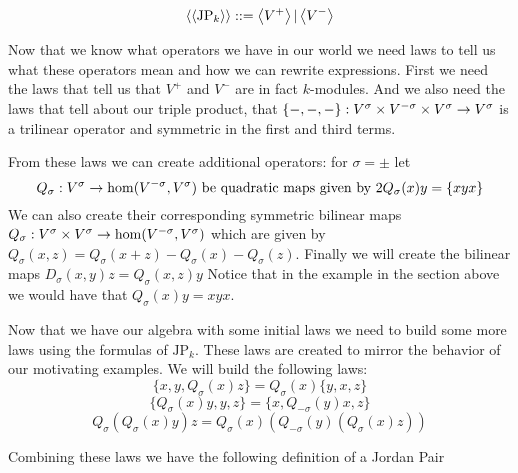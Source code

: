 \[\left\langle \left\langle \text{JP}_k \right\rangle \right\rangle::= \left\langle V^+ \right\rangle | \left\langle V^- \right\rangle\]

Now that we know what operators we have in our world we need laws to tell us what these operators mean and how we can rewrite expressions.
First we need the laws that tell us that $V^+$ and $V^-$ are in fact $k$-modules.
And we also need the laws that tell about our triple product, that $\{-,-,-\}:V^\sigma\times V^{-\sigma}\times V^\sigma\rightarrow V^\sigma$ is a trilinear operator and symmetric in the first and third terms. 

From these laws we can create additional operators: for $\sigma=\pm$ let
\[Q_\sigma:V^\sigma\rightarrow \hom(V^{-\sigma},V^{\sigma})\text{ be quadratic maps given by }2Q_\sigma(x)y = \{xyx\}\]
We can also create their corresponding symmetric bilinear maps 
$Q_\sigma:V^\sigma\times V^\sigma\rightarrow \hom(V^{-\sigma},V^{\sigma})$ which are given by 
$Q_\sigma(x,z)=Q_\sigma(x+z)-Q_\sigma(x)-Q_\sigma(z)$. %
Finally we will create the bilinear maps $D_\sigma(x,y)z=Q_\sigma(x,z)y$
Notice that in the example in the section above we would have that $Q_\sigma(x)y=xyx$.

Now that we have our algebra with some initial laws we need to build some more laws using the formulas of $\text{JP}_k$.
These laws are created to mirror the behavior of our motivating examples.
We will build the following laws:
\begin{equation}
    \tag{JP1}
    \{x,y,Q_\sigma(x)z\}=Q_\sigma(x)\{y,x,z\}
\end{equation}
\begin{equation}
    \tag{JP2}
    \{Q_\sigma(x)y,y,z\}=\{x,Q_{-\sigma}(y)x,z\}
\end{equation}
\begin{equation}
    \tag{JP3}
    Q_{\sigma}(Q_{\sigma}(x)y)z=Q_{\sigma}(x)(Q_{-\sigma}(y)(Q_{\sigma}(x)z))
\end{equation}


Combining these laws we have the following definition of a Jordan Pair

